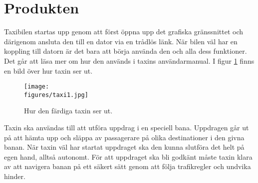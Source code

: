\documentclass[tekniskrapport/tech.tex]{subfiles}
\begin{document}
\section{Produkten}
Taxibilen startas upp genom att först öppna upp det grafiska gränssnittet och
därigenom ansluta den till en dator via en trådlös länk. När bilen väl har en
koppling till datorn är det bara att börja använda den och alla dess
funktioner. Det går att läsa mer om hur den används i taxins användarmanual. I figur
\ref{fig:taxi1} finns en bild över hur taxin ser ut.

\begin{figure}[H]
    \centering
    \texttt{[image: \\figures/taxi1.jpg]}
    \caption{Hur den färdiga taxin ser ut.}
    \label{fig:taxi1}
\end{figure}

\noindent
Taxin ska användas till att utföra uppdrag i en speciell bana. Uppdragen går ut
på att hämta upp och släppa av passagerare på olika destinationer i den givna
banan. När taxin väl har startat uppdraget ska den kunna slutföra det helt på
egen hand, alltså autonomt. För att uppdraget ska bli godkänt måste taxin klara
av att navigera banan på ett säkert sätt genom att följa trafikregler och
undvika hinder.
\end{document}
